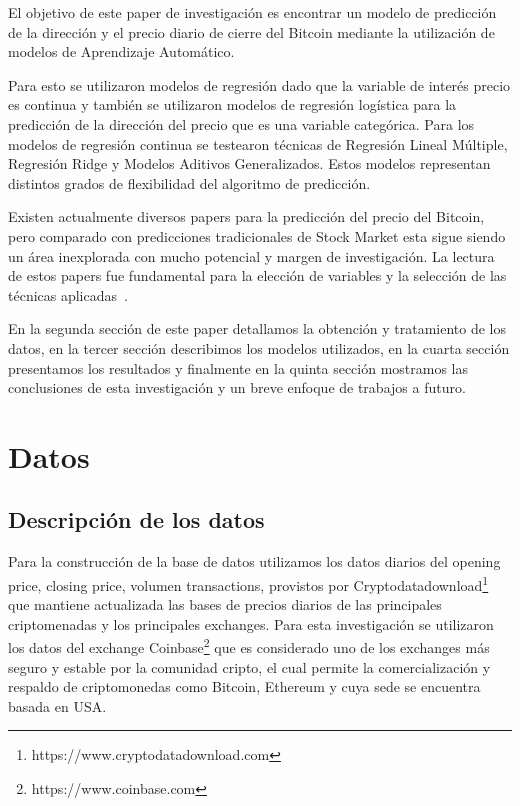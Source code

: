 \documentclass[a4paper,12pt,twocolumn]{article}
\begin{document}
El objetivo de este paper de investigación es encontrar un modelo de predicción de la dirección y el  precio diario de cierre del Bitcoin mediante la utilización de modelos de Aprendizaje Automático. 

Para esto se utilizaron modelos de regresión dado que la variable de interés precio es continua y también se utilizaron modelos de regresión logística para la predicción de la dirección del precio que es una variable categórica. Para los modelos de regresión continua se testearon técnicas de Regresión Lineal Múltiple, Regresión Ridge y Modelos Aditivos Generalizados. Estos modelos representan distintos grados de flexibilidad del algoritmo de predicción. 

Existen actualmente diversos papers para la predicción del precio del Bitcoin, pero comparado con predicciones tradicionales de Stock Market esta sigue siendo un área inexplorada con mucho potencial y margen de investigación. La lectura de estos papers fue fundamental para la elección de variables y la selección de las técnicas aplicadas~\cite{mainDriversBitcoin}.

En la segunda sección de este paper detallamos la obtención y tratamiento de los datos, en la tercer sección describimos los modelos utilizados, en la cuarta sección presentamos los resultados y finalmente en la quinta sección mostramos las conclusiones de esta investigación y un breve enfoque de trabajos a futuro.



\section{Datos}
\subsection{Descripción de los datos}

Para la construcción de la base de datos utilizamos los datos diarios del opening price, closing price, volumen transactions,  provistos por Cryptodatadownload\footnote{https://www.cryptodatadownload.com}  que mantiene actualizada las bases de precios diarios de las principales criptomenadas y los principales exchanges. Para esta investigación se utilizaron los datos del exchange Coinbase\footnote{https://www.coinbase.com} que es considerado uno de los exchanges  más seguro y estable por la comunidad cripto, el cual permite la comercialización y respaldo de criptomonedas como Bitcoin, Ethereum y cuya sede se encuentra basada en USA. 
\end{document}
